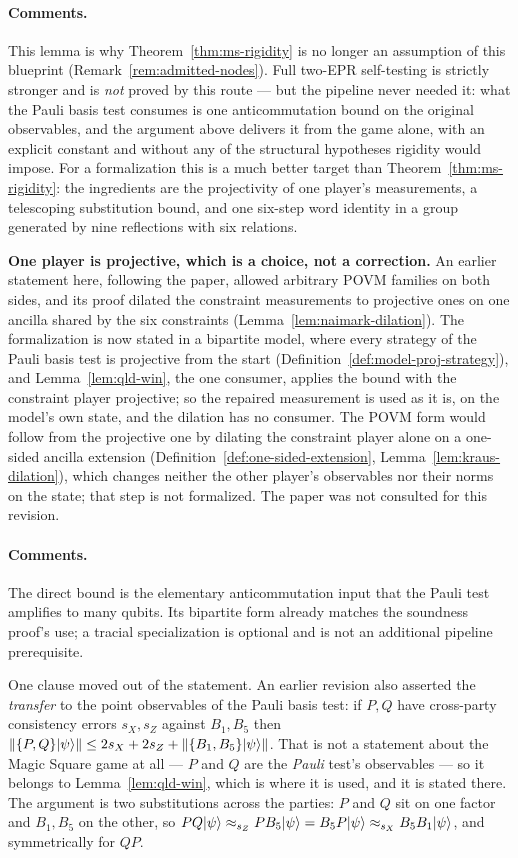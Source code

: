 \paragraph{Comments.} This lemma is why Theorem~\ref{thm:ms-rigidity} is no longer an
assumption of this blueprint (Remark~\ref{rem:admitted-nodes}). Full two-EPR self-testing is
strictly stronger and is \emph{not} proved by this route --- but the pipeline never needed it:
what the Pauli basis test consumes is one anticommutation bound on the original observables,
and the argument above delivers it from the game alone, with an explicit constant and without
any of the structural hypotheses rigidity would impose. For a formalization this is a much
better target than Theorem~\ref{thm:ms-rigidity}: the ingredients are the projectivity of one
player's measurements, a telescoping substitution bound, and one six-step word identity in a group
generated by nine reflections with six relations.

\textbf{One player is projective, which is a choice, not a correction.} An earlier statement here,
following the paper, allowed arbitrary POVM families on both sides, and its proof dilated the
constraint measurements to projective ones on one ancilla shared by the six constraints
(Lemma~\ref{lem:naimark-dilation}). The formalization is now stated in a bipartite model, where
every strategy of the Pauli basis test is projective from the start
(Definition~\ref{def:model-proj-strategy}), and Lemma~\ref{lem:qld-win}, the one consumer, applies
the bound with the constraint player projective; so the repaired measurement is used as it is,
on the model's own state, and the dilation has no consumer. The POVM form would follow from the
projective one by dilating the constraint player alone on a one-sided ancilla extension
(Definition~\ref{def:one-sided-extension}, Lemma~\ref{lem:kraus-dilation}), which changes neither
the other player's observables nor their norms on the state; that step is not formalized. The paper was not consulted for this revision.

\paragraph{Comments.} The direct bound is the elementary anticommutation input that
the Pauli test amplifies to many qubits. Its bipartite form already matches the
soundness proof's use; a tracial specialization is optional and is not an additional
pipeline prerequisite.

One clause moved out of the statement. An earlier revision also asserted the \emph{transfer}
to the point observables of the Pauli basis test: if $P, Q$ have cross-party consistency errors
$s_X, s_Z$ against $B_1, B_5$ then
$\left\| {\{P,Q\}|\psi\rangle} \right\| \leq 2 s_X + 2 s_Z + \left\| {\{B_1,B_5\}|\psi\rangle} \right\|$. That is not a
statement about the Magic Square game at all --- $P$ and $Q$ are the \emph{Pauli} test's
observables --- so it belongs to Lemma~\ref{lem:qld-win}, which is where it is used, and it is
stated there. The argument is two substitutions across the parties: $P$ and $Q$ sit on one
factor and $B_1, B_5$ on the other, so $PQ|\psi\rangle \approx_{s_Z} P B_5 |\psi\rangle
= B_5 P |\psi\rangle \approx_{s_X} B_5 B_1 |\psi\rangle$, and symmetrically for $QP$.

